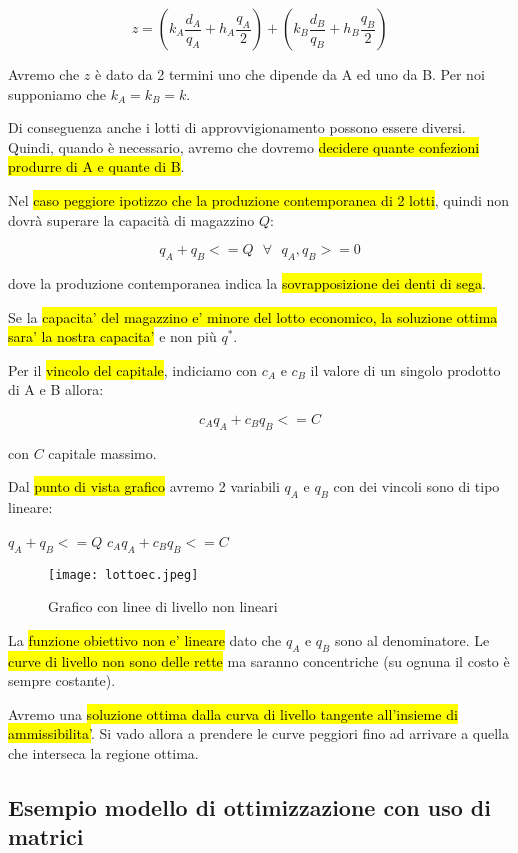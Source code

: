 $$z = (k_A \frac{d_A}{q_A} + h_A \frac{q_A}{2}) + (k_B \frac{d_B}{q_B} + h_B \frac{q_B}{2})$$


Avremo che $z$ è dato da 2 termini uno che dipende da A ed uno da B. Per noi supponiamo che $k_A = k_B = k$.

Di conseguenza anche i lotti di approvvigionamento possono essere diversi. Quindi, quando è necessario, avremo che dovremo \hl{decidere quante confezioni produrre di A e quante di B}.

Nel \hl{caso peggiore ipotizzo che la produzione contemporanea di 2 lotti}, quindi non dovrà superare la capacità di magazzino $Q$:

$$q_A + q_B <= Q\ \ \ \forall\ \ \ q_A, q_B >= 0$$

dove la produzione contemporanea indica la \hl{sovrapposizione dei denti di sega}.

Se la \hl{capacita' del magazzino e' minore del lotto economico, la soluzione ottima sara' la nostra capacita'} e non più $q^*$.

Per il \hl{vincolo del capitale}, indiciamo con $c_A$ e $c_B$ il valore di un singolo prodotto di A e B allora:

$$c_Aq_A + c_Bq_B <= C$$

con $C$ capitale massimo.

Dal \hl{punto di vista grafico} avremo 2 variabili $q_A$ e $q_B$ con dei vincoli sono di tipo lineare:

$q_A + q_B <= Q$
$c_Aq_A + c_Bq_B <= C$


\begin{figure}[H]
\centering
\texttt{[image: lottoec.jpeg]}
\caption{Grafico con linee di livello non lineari} 
\label{linlivnonlin}
\end{figure}


La \hl{funzione obiettivo non e' lineare} dato che $q_A$ e $q_B$ sono al denominatore. Le \hl{curve di livello non sono delle rette} ma saranno concentriche (su ognuna il costo è sempre costante).

Avremo una \hl{soluzione ottima dalla curva di livello tangente all'insieme di ammissibilita'}. Si vado allora a prendere le curve peggiori fino ad arrivare a quella che interseca la regione ottima.


\subsection{Esempio modello di ottimizzazione con uso di matrici}

